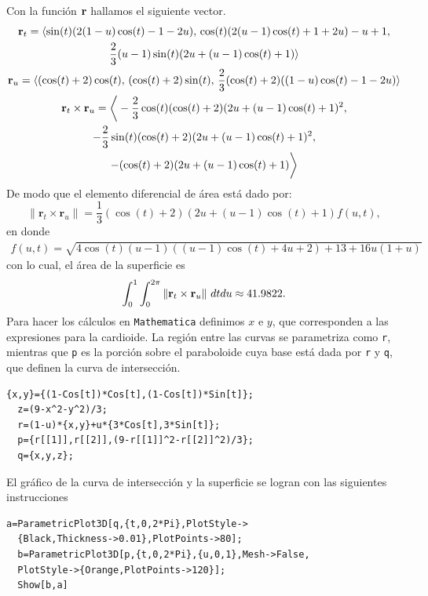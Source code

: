 Con la función ${\bf r}$ hallamos el siguiente vector.
\begin{gather*}
{\bf r}_{t} = \langle \sin(t)(2(1-u)\cos(t)-1-2u),\, \cos(t)(2(u-1)\cos(t)+1+2u)-u+1, \\
\frac{2}{3}(u-1)\sin(t)(2u+(u-1)\cos(t)+1) \rangle \\
{\bf r}_{u} = \langle (\cos(t)+2)\cos(t),\, (\cos(t)+2)\sin(t),\, \frac{2}{3}(\cos(t)+2)((1-u)\cos(t)-1-2u) \rangle \\
{\bf r}_{t}\times{\bf r}_{u}=\bigg \langle-\frac{2}{3}\cos(t)(\cos(t)+2)(2u+(u-1)\cos(t)+1)^{2},\\
-\frac{2}{3}\sin(t)(\cos(t)+2)(2u+(u-1)\cos(t)+1)^{2},\\ -(\cos(t)+2)(2u+(u-1)\cos(t)+1)\bigg \rangle
\end{gather*}
De modo que el elemento diferencial de área está dado por:
\[
\lVert \mathbf{r}_t \times \mathbf{r}_u \rVert = \frac{1}{3}(\cos(t) + 2)(2u + (u - 1)\cos(t) + 1)f(u,t),
\]
en donde
\begin{gather*}
f(u,t) = \sqrt{4\cos(t)(u - 1)((u - 1)\cos(t) + 4u + 2) + 13 + 16u(1 + u)}
\end{gather*}
con lo cual, el área de la superficie es
\[\int_{0}^{1}\int_{0}^{2\pi} \|{\bf r}_{t}\times {\bf r}_{u}\|\,\, dtdu\approx 41.9822.\]
Para hacer los cálculos en \verb"Mathematica" definimos $x$ e $y$, que corresponden a las expresiones para la cardioide. La región entre las curvas se parametriza como \verb"r", mientras que
\verb"p" es la porción sobre el paraboloide cuya base está dada por \verb"r" y \verb"q", que definen la curva de intersección.

\begin{tcolorbox}[title=\bf Instrucción en \verb"Mathematica"]
  \begin{Verbatim}[formatcom=\letraverbatim]
  {x,y}={(1-Cos[t])*Cos[t],(1-Cos[t])*Sin[t]};
  z=(9-x^2-y^2)/3;
  r=(1-u)*{x,y}+u*{3*Cos[t],3*Sin[t]};
  p={r[[1]],r[[2]],(9-r[[1]]^2-r[[2]]^2)/3};
  q={x,y,z};
  \end{Verbatim}
\end{tcolorbox}

El gráfico de la curva de intersección y la superficie se logran con las siguientes instrucciones

\begin{tcolorbox}[title=\bf Instrucción en \verb"Mathematica"]
  \begin{Verbatim}[formatcom=\letraverbatim]
  a=ParametricPlot3D[q,{t,0,2*Pi},PlotStyle->
  {Black,Thickness->0.01},PlotPoints->80];
  b=ParametricPlot3D[p,{t,0,2*Pi},{u,0,1},Mesh->False,
  PlotStyle->{Orange,PlotPoints->120}];
  Show[b,a]
\end{Verbatim}
\end{tcolorbox}

